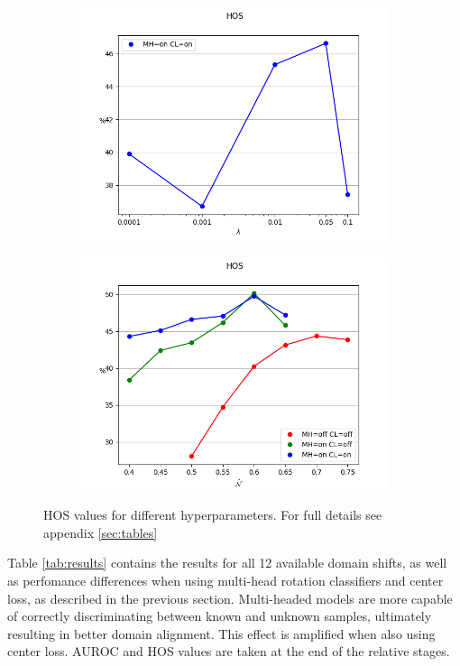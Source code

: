 \documentclass[10pt,twocolumn,letterpaper]{article}
\begin{document}
\begin{figure}[!htb]
\begin{subfigure}[!htb]{0.35\textwidth}
    \includegraphics[trim=0 0 0 2cm, clip, width=\linewidth]{hos-l.png}
  \end{subfigure}
  \begin{subfigure}[!htb]{0.35\textwidth}
    \includegraphics[trim=0 0 0 2cm, clip, width=\linewidth]{hos-th.png}
  \end{subfigure}
  \caption{\centering\label{fig:hyperparams} HOS values for different hyperparameters. For full details see appendix \ref{sec:tables}}
\end{figure}

Table \ref{tab:results} contains the results for all 12 available domain shifts,
as well as perfomance differences when using multi-head rotation classifiers and center loss,
as described in the previous section.
Multi-headed models are more capable of correctly discriminating between known and unknown samples,
ultimately resulting in better domain alignment.
This effect is amplified when also using center loss.
AUROC and HOS values are taken at the end of the relative stages. 
\end{document}
